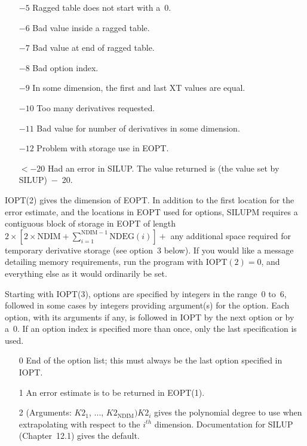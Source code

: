 \documentclass[twoside]{MATH77}
\begin{document}
\begin{description}
\begin{itemize}
\item[$-5$]  Ragged table does not start with a~0.
\item[$-6$]  Bad value inside a ragged table.
\item[$-7$]  Bad value at end of ragged table.
\item[$-8$]  Bad option index.
\item[$-9$]  In some dimension, the first and last XT values are equal.
\item[$-10$]  Too many derivatives requested.
\item[$-11$]  Bad value for number of derivatives in some dimension.
\item[$-12$]  Problem with storage use in EOPT.
\item[$<${$-20$}]  Had an error in SILUP. The value returned is (the value
set by SILUP)~$-$~20.
\end{itemize}
IOPT(2) gives the dimension of EOPT. In addition to the first location for
the error estimate, and the locations in EOPT used for options, SILUPM
requires a contiguous block of storage in EOPT of length $2\times \left[
2 \times \text{NDIM} + \sum_{i=1}^{\text{NDIM}-1}\text{NDEG}(i)\right]
+$ any additional space required for temporary derivative storage (see option~3
below). If you would like a message detailing memory requirements, run the
program with IOPT$(2)=0$, and everything else as it would ordinarily be set.

Starting with IOPT(3), options are specified by integers in the range~0 to~6,
followed in some cases by integers providing argument(s) for the option.
Each option, with its arguments if any, is followed in IOPT by the next
option or by a~0.  If an option index is specified more than once,
only the last specification is used.
\begin{itemize}
\item[0]  End of the option list; this must always be the last option
specified in IOPT.
\item[1]  An error estimate is to be returned in EOPT(1).
\item[2]  (Arguments: $K2_1$, ..., $K2_{\text{NDIM}})K2_i$ gives the
polynomial degree to use when extrapolating with respect to the $i^{th}$
dimension. Documentation for SILUP (Chapter~12.1) gives the default.


\end{itemize}
\end{description}
\end{document}
